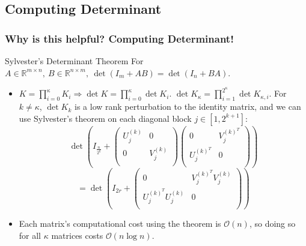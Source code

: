 \documentclass{beamer}
\begin{document}
  \subsection{Computing Determinant}
 \begin{frame}\frametitle{Why is this helpful? Computing Determinant!}
 \begin{block}{Sylvester's Determinant Theorem}
 For $A\in \mathbb{R}^{m\times n}, \ B \in \mathbb{R}^{n\times m},\ \det(I_m + AB) = \det(I_n+BA)$.
 \end{block}
 \begin{itemize}
 \item $K = \prod^\kappa_{i=0} K_i \Rightarrow \det K = \prod^\kappa_{i=0}  \det K_i$. $\det K_\kappa = \prod_{i=1}^{2^\kappa} \det K_{\kappa,i}$. For $k\neq \kappa$, $\det K_k$ is a low rank perturbation to the identity matrix, and we can use Sylvester's theorem on each diagonal block $j \in [1,2^{k+1}]$:
 $$\det\left(I_{\frac{n}{2^{k}}}+ \begin{pmatrix} U_j^{(k)} & 0 \\ 0 & V_j^{(k)} \\ \end{pmatrix}\begin{pmatrix} 0 & V_j^{(k)^T} \\ U_j^{(k)^T} & 0 \\ \end{pmatrix} \right)$$
 $$ = \det \left(I_{2r} +\begin{pmatrix} 0 &V_j^{(k)^T}V_j^{(k)}\\ U_j^{(k)^T}U_j^{(k)} & 0\\  \end{pmatrix} \right)$$
 \item Each matrix's computational cost using the theorem is $\mathcal{O}(n)$, so doing so for all $\kappa$ matrices costs $\mathcal{O}(n\log n)$.
 \end{itemize}
\end{frame}
\end{document}
